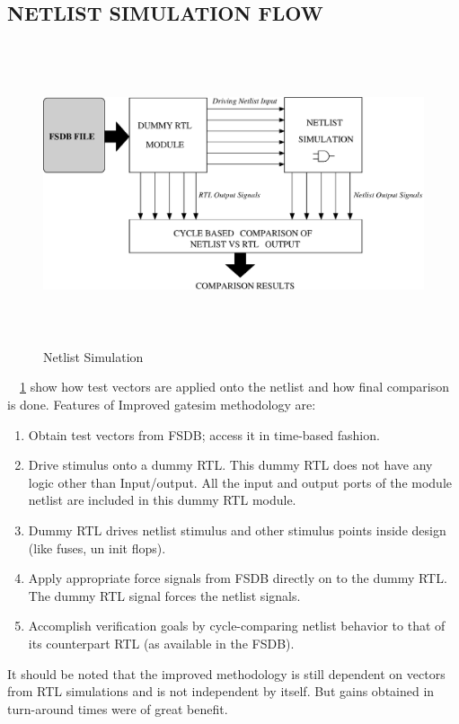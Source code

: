 \subsection{NETLIST SIMULATION FLOW}
\begin{figure}[H]
\centering
\includegraphics[width=5in, height=3.5in]{./figures/dualsim_sim.eps}
\caption{Netlist Simulation}
\label{fig:dualsim_sim.eps}
\end{figure}

~\figurename{~\ref{fig:dualsim_sim.eps}} show how test vectors are applied onto the netlist and how final comparison is done. Features of Improved gatesim methodology are:
\begin{enumerate}
	\item Obtain test vectors from FSDB; access it in time-based fashion.
	\item Drive stimulus onto a dummy RTL. This dummy RTL does not have any logic other than Input/output. All the input and output ports of the module netlist are included in this dummy RTL module. 
	\item Dummy RTL drives netlist stimulus and other stimulus points inside design (like fuses, un init flops).
	\item Apply appropriate force signals from FSDB directly on to the dummy RTL. The dummy RTL signal forces the netlist signals.
	\item Accomplish verification goals by cycle-comparing netlist behavior to that of its counterpart RTL (as available in the FSDB).
\end{enumerate}
It should be noted that the improved methodology is still dependent on vectors from RTL simulations and is not independent by itself. But gains obtained in turn-around times were of great benefit.



